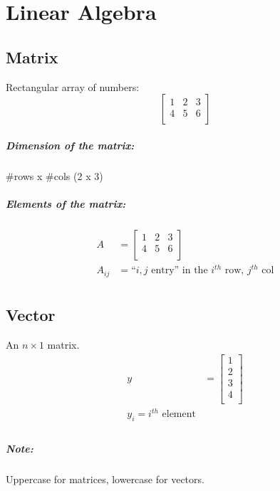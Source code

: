 \chapter{Linear Algebra}
\section{Matrix}
Rectangular array of numbers:
$$
    \begin{bmatrix}
        1 & 2 & 3 \\
        4 & 5 & 6 \\
    \end{bmatrix}
$$

\paragraph*{Dimension of the matrix:} \#rows x \#cols (2 x 3)

\paragraph*{Elements of the matrix:}
\begin{align*}
    A      & =	\begin{bmatrix}
        1 & 2 & 3 \\
        4 & 5 & 6 \\
    \end{bmatrix}                                 \\
    A_{ij} & = \text{``$i,j$ entry'' in the $i^{th}$ row, $j^{th}$ col} \\
\end{align*}

\section{Vector}
An $n \times 1$ matrix.
\begin{align*}
    y & =	\begin{bmatrix}
        1 \\
        2 \\
        3 \\
        4 \\
    \end{bmatrix} \\
    y_i = i^{th} \text{ element}   \\
\end{align*}

\paragraph*{Note:} Uppercase for matrices, lowercase for vectors.

